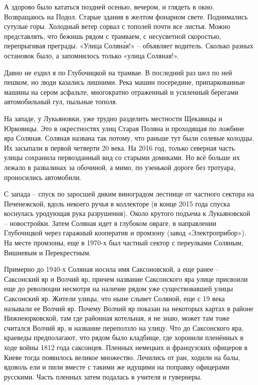 А здорово было кататься поздней осенью, вечером, и глядеть в окно. Возвращаюсь на Подол. Старые здания в желтом фонарном свете. Поднимались сутулые горы. Холодный ветер сорвал с тополей почти все листья. Можно представлять, что бежишь рядом с трамваем, с несусветной скоростью, перепрыгивая преграды. «Улица Солян\'ая!» – объявляет водитель. Сколько разных остановок было, а запомнилось только «улица Соляная!».


Давно не ездил я по Глубочицкой на трамвае. В последний раз шел по ней пешком, но люди казались лишними. Река машин посередине, припаркованные машины на сером асфальте, многократно отраженный и усиленный берегами автомобильный гул, пыльные тополя.

На западе, у Лукьяновки, уже трудно разделить местности Щекавицы и Юрковицы. Это в окрестностях улиц Старая Поляна и проходящая по ложбине яра Соляная. Соляная названа так потому, что раньше тут были солевые колодцы. Их засыпали в первой четверти 20 века. На 2016 год, только северная часть улицы сохранила первозданный вид со старыми домиками. Но всё больше их лежало в развалинах за обочиной, а мимо, по узенькой дороге без тротуара, проносились автомобили.

С запада – спуск по заросшей диким виноградом лестнице от частного сектора на Печенежской, вдоль некоего ручья в коллекторе (в конце 2015 года спуска коснулась уродующая рука разрушения). Около крутого подъема к Лукьяновской – новостройки. Затем Соляная идет в глубоком овраге, в направлении Глубочицкой через гаражный кооператив и промзону (завод «Электроприбор»). На месте промзоны, еще в 1970-х был частный сектор с переулками Соляным, Вишневым и Перекрестным.

Примерно до 1940-х Соляная носила имя Саксоновской, а еще ранее – Саксонский яр и Волчий яр, причем название Саксонского яра улице присвоили еще до революции несмотря на наличие рядом уже существовавшей улицы Саксонский яр. Жители улицы, что ныне слывет Соляной, еще с 19 века называли ее Волчий яр. Почему Волчий яр показан на некоторых картах в районе Нижнеюрковской, там где районная котельная, я не знаю, может там тоже считался Волчий яр, и название переползло на улицу. Что до Саксонского яра, краеведы предполагают, что рядом было кладбище, где хоронили пленённых в ходе войны 1812 года саксонцев. Пленных немецких и французских офицеров в Киеве тогда появилось великое множество. Лечились от ран, ходили на балы, вдоволь ели и пили вместе с такими же идущими на поправку офицерами русскими. Часть пленных затем подалась в учителя и гувернеры.


